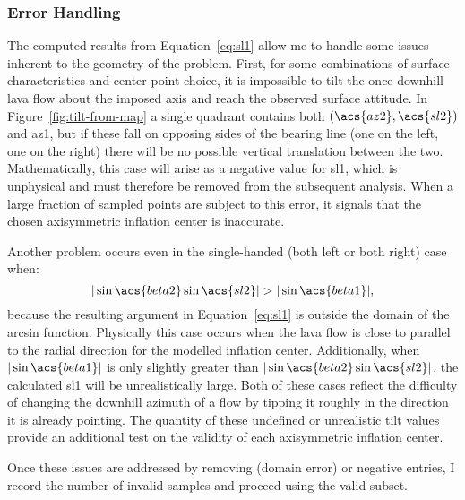 \subsubsection{Error Handling}
The computed results from Equation~\eqref{eq:sl1} allow me to handle some issues inherent to the geometry of the problem. First, for some combinations of surface characteristics and center point choice, it is impossible to tilt the once-downhill lava flow about the imposed axis and reach the observed surface attitude. In Figure~\ref{fig:tilt-from-map} a single quadrant contains both $\left(\acs{az2},\acs{sl2}\right)$ and \acs{az1}, but if these fall on opposing sides of the \acs{bearing} line (one on the left, one on the right) there will be no possible vertical translation between the two. Mathematically, this case will arise as a negative value for \acs{sl1}, which is unphysical and must therefore be removed from the subsequent analysis. When a large fraction of sampled points are subject to this error, it signals that the chosen axisymmetric inflation center is inaccurate.

Another problem occurs even in the single-handed (both left or both right) case when:
\begin{equation}
     |\sin\acs{beta2}\sin\acs{sl2}| > |\sin\acs{beta1}|,
\end{equation}
because the resulting argument in Equation~\eqref{eq:sl1} is outside the domain of the arcsin function. Physically this case occurs when the lava flow is close to parallel to the radial direction for the modelled inflation center. Additionally, when $|\sin\acs{beta1}|$ is only slightly greater than $|\sin\acs{beta2}\sin\acs{sl2}|$, the calculated \acs{sl1} will be unrealistically large. Both of these cases reflect the difficulty of changing the downhill azimuth of a flow by tipping it roughly in the direction it is already pointing. The quantity of these undefined or unrealistic tilt values provide an additional test on the validity of each axisymmetric inflation center.

Once these issues are addressed by removing  (domain error) or negative entries, I record the number of invalid samples and proceed using the valid subset.


